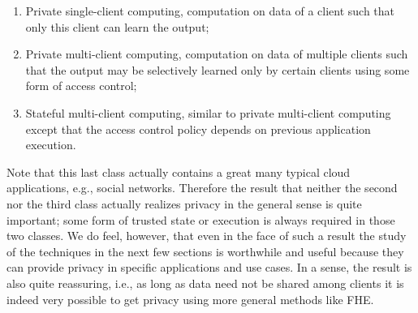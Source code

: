 \documentclass[11pt, a4paper]{article}
\begin{document}
\begin{enumerate}
    \item Private single-client computing, computation on data of a client such that only this client can learn the output;
    \item Private multi-client computing, computation on data of multiple clients such that the output may be selectively learned only by certain clients using some form of access control;
    \item Stateful multi-client computing, similar to private multi-client computing except that the access control policy depends on previous application execution.
\end{enumerate}

Note that this last class actually contains a great many typical cloud applications, e.g., social networks. 
Therefore the result that neither the second nor the third class actually realizes privacy in the general sense is quite important; some form of trusted state or execution is always required in those two classes.
We do feel, however, that even in the face of such a result the study of the techniques in the next few sections is worthwhile and useful because they can provide privacy in specific applications and use cases.
In a sense, the result is also quite reassuring, i.e., as long as data need not be shared among clients it is indeed very possible to get privacy using more general methods like FHE.


\end{document}

